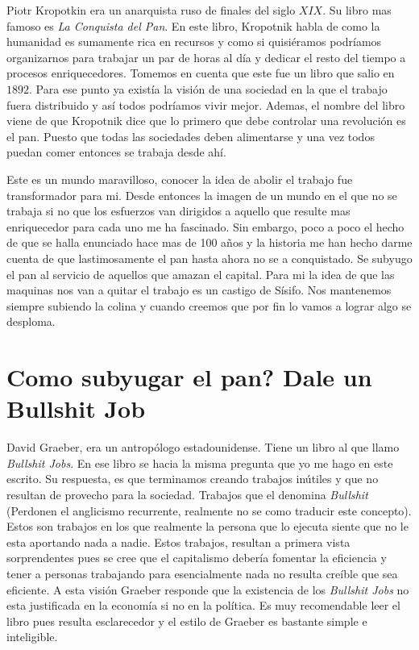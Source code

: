 \documentclass{report}
\begin{document}
Piotr Kropotkin era un anarquista ruso de finales del siglo $XIX$. Su libro mas famoso es \textit{La Conquista del Pan}. En este libro, Kropotnik habla de como la humanidad es sumamente rica en recursos y como si quisiéramos podríamos organizarnos para trabajar un par de horas al día y dedicar el resto del tiempo a procesos enriquecedores. Tomemos en cuenta que este fue un libro que salio en $1892$. Para ese punto ya existía la visión de una sociedad en la que el trabajo fuera distribuido y así todos podríamos vivir mejor. Ademas, el nombre del libro viene de que Kropotnik dice que lo primero que debe controlar una revolución es el pan. Puesto que todas las sociedades deben alimentarse y una vez todos puedan comer entonces se trabaja desde ahí. 

Este es un mundo maravilloso, conocer la idea de abolir el trabajo fue transformador para mi. Desde entonces la imagen de un mundo en el que no se trabaja si no que los esfuerzos van dirigidos a aquello que resulte mas enriquecedor para cada uno me ha fascinado. Sin embargo, poco a poco el hecho de que se halla enunciado hace mas de 100 años y la historia me han hecho darme cuenta de que lastimosamente el pan hasta ahora no se a conquistado. Se subyugo el pan al servicio de aquellos que amazan el capital. Para mi la idea de que las maquinas nos van a quitar el trabajo es un castigo de Sísifo. Nos mantenemos siempre subiendo la colina y cuando creemos que por fin lo vamos a lograr algo se desploma.

\section{Como subyugar el pan? Dale un Bullshit Job}

David Graeber, era un antropólogo estadounidense. Tiene un libro al que llamo \textit{Bullshit Jobs}. En ese libro se hacia la misma pregunta que yo me hago en este escrito. Su respuesta, es que terminamos creando trabajos inútiles y que no resultan de provecho para la sociedad. Trabajos que el denomina \textit{Bullshit} (Perdonen el anglicismo recurrente, realmente no se como traducir este concepto). Estos son trabajos en los que realmente la persona que lo ejecuta siente que no le esta aportando nada a nadie. Estos trabajos, resultan a primera vista sorprendentes pues se cree que el capitalismo debería fomentar la eficiencia y tener a personas trabajando para esencialmente nada no resulta creíble que sea eficiente. A esta visión Graeber responde que la existencia de los \textit{Bullshit Jobs} no esta justificada en la economía si no en la política. Es muy recomendable leer el libro pues resulta esclarecedor y el estilo de Graeber es bastante simple e inteligible. 
\end{document}
